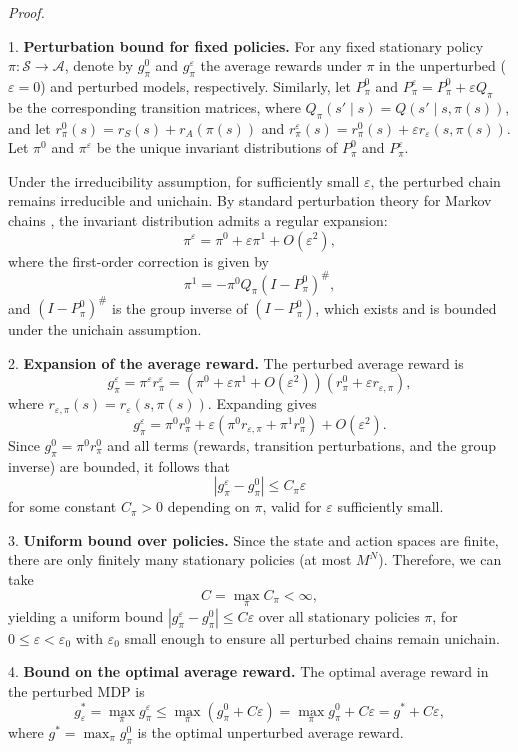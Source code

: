 \documentclass{article}
\begin{document}
\textit{Proof.}  

1. {\bf Perturbation bound for fixed policies.}  
For any fixed stationary policy $\pi : \mathcal{S} \to \mathcal{A}$, denote by $g_\pi^0$ and $g_\pi^\varepsilon$ the average rewards under $\pi$ in the unperturbed ($\varepsilon=0$) and perturbed models, respectively. Similarly, let $P_\pi^0$ and $P_\pi^\varepsilon = P_\pi^0 + \varepsilon Q_\pi$ be the corresponding transition matrices, where $Q_\pi(s' \mid s) = Q(s' \mid s, \pi(s))$, and let $r_\pi^0(s) = r_S(s) + r_A(\pi(s))$ and $r_\pi^\varepsilon(s) = r_\pi^0(s) + \varepsilon r_\varepsilon(s, \pi(s))$. Let $\pi^0$ and $\pi^\varepsilon$ be the unique invariant distributions of $P_\pi^0$ and $P_\pi^\varepsilon$.

Under the irreducibility assumption, for sufficiently small $\varepsilon$, the perturbed chain remains irreducible and unichain. By standard perturbation theory for Markov chains \cite{Meyer1980,Seneta1981}, the invariant distribution admits a regular expansion:
\[
\pi^\varepsilon = \pi^0 + \varepsilon \pi^1 + O(\varepsilon^2),
\]
where the first-order correction is given by
\[
\pi^1 = -\pi^0 Q_\pi (I - P_\pi^0)^\#,
\]
and $(I - P_\pi^0)^\#$ is the group inverse of $(I - P_\pi^0)$, which exists and is bounded under the unichain assumption.

2. {\bf Expansion of the average reward.}  
The perturbed average reward is
\[
g_\pi^\varepsilon = \pi^\varepsilon r_\pi^\varepsilon = (\pi^0 + \varepsilon \pi^1 + O(\varepsilon^2)) (r_\pi^0 + \varepsilon r_{\varepsilon,\pi}),
\]
where $r_{\varepsilon,\pi}(s) = r_\varepsilon(s, \pi(s))$. Expanding gives
\[
g_\pi^\varepsilon = \pi^0 r_\pi^0 + \varepsilon (\pi^0 r_{\varepsilon,\pi} + \pi^1 r_\pi^0) + O(\varepsilon^2).
\]
Since $g_\pi^0 = \pi^0 r_\pi^0$ and all terms (rewards, transition perturbations, and the group inverse) are bounded, it follows that
\[
|g_\pi^\varepsilon - g_\pi^0| \le C_\pi \varepsilon
\]
for some constant $C_\pi > 0$ depending on $\pi$, valid for $\varepsilon$ sufficiently small.

3. {\bf Uniform bound over policies.}  
Since the state and action spaces are finite, there are only finitely many stationary policies (at most $M^N$). Therefore, we can take
\[
C = \max_\pi C_\pi < \infty,
\]
yielding a uniform bound $|g_\pi^\varepsilon - g_\pi^0| \le C \varepsilon$ over all stationary policies $\pi$, for $0 \le \varepsilon < \varepsilon_0$ with $\varepsilon_0$ small enough to ensure all perturbed chains remain unichain.

4. {\bf Bound on the optimal average reward.}  
The optimal average reward in the perturbed MDP is
\[
g_\varepsilon^* = \max_\pi g_\pi^\varepsilon \le \max_\pi (g_\pi^0 + C \varepsilon) = \max_\pi g_\pi^0 + C \varepsilon = g^* + C \varepsilon,
\]
where $g^* = \max_\pi g_\pi^0$ is the optimal unperturbed average reward.
\end{document}
